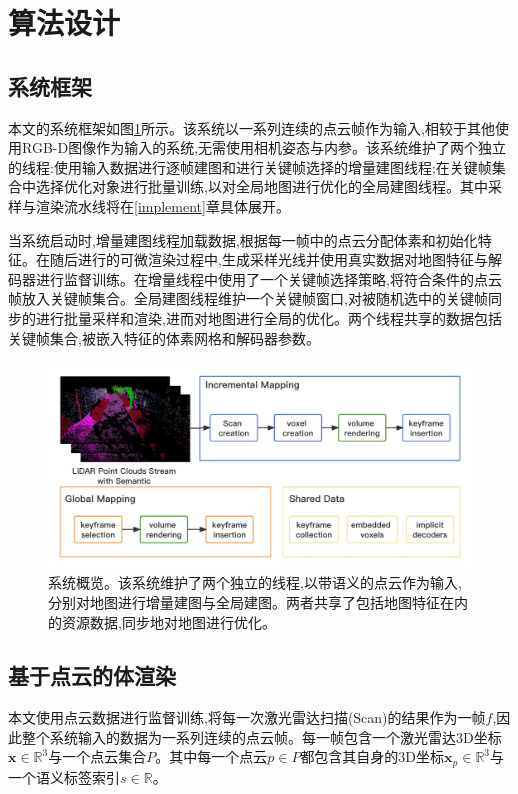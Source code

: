 \section{算法设计}\label{algorithm}
\subsection{系统框架}
本文的系统框架如图\ref{system}所示。该系统以一系列连续的点云帧作为输入,相较于其他使用RGB-D图像作为输入的系统,无需使用相机姿态与内参。该系统维护了两个独立的线程:使用输入数据进行逐帧建图和进行关键帧选择的增量建图线程;在关键帧集合中选择优化对象进行批量训练,以对全局地图进行优化的全局建图线程。其中采样与渲染流水线将在\ref{implement}章具体展开。

当系统启动时,增量建图线程加载数据,根据每一帧中的点云分配体素和初始化特征。在随后进行的可微渲染过程中,生成采样光线并使用真实数据对地图特征与解码器进行监督训练。在增量线程中使用了一个关键帧选择策略,将符合条件的点云帧放入关键帧集合。全局建图线程维护一个关键帧窗口,对被随机选中的关键帧同步的进行批量采样和渲染,进而对地图进行全局的优化。两个线程共享的数据包括关键帧集合,被嵌入特征的体素网格和解码器参数。
\begin{figure}[htbp]
    \includegraphics[scale = 0.355]{figures/system_1.jpg}
    \centering
    \caption{系统概览。该系统维护了两个独立的线程,以带语义的点云作为输入,分别对地图进行增量建图与全局建图。两者共享了包括地图特征在内的资源数据,同步地对地图进行优化。}\label{system}
\end{figure}
\subsection{基于点云的体渲染}
本文使用点云数据进行监督训练,将每一次激光雷达扫描(Scan)的结果作为一帧$f$,因此整个系统输入的数据为一系列连续的点云帧。每一帧包含一个激光雷达3D坐标$\mathbf{x}\in \mathbb{R}^3 $与一个点云集合$P$。其中每一个点云$p\in P$都包含其自身的3D坐标$\mathbf{x}_p\in \mathbb{R}^3$与一个语义标签索引$s\in \mathbb{R}$。
